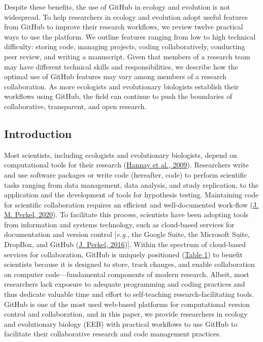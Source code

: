 Despite these benefits, the use of GitHub in ecology and evolution is not widespread.
To help researchers in ecology and evolution adopt useful features from GitHub to improve their research workflows, we review twelve practical ways to use the platform.
We outline features ranging from low to high technical difficulty: storing code, managing projects, coding collaboratively, conducting peer review, and writing a manuscript.
Given that members of a research team may have different technical skills and responsibilities, we describe how the optimal use of GitHub features may vary among members of a research collaboration.
As more ecologists and evolutionary biologists establish their workflows using GitHub, the field can continue to push the boundaries of collaborative, transparent, and open research.

\hypertarget{introduction}{%
\subsection{Introduction}\label{introduction}}

Most scientists, including ecologists and evolutionary biologists, depend on computational tools for their research (\protect\hyperlink{ref-fJWFe93e}{Hannay et al., 2009}).
Researchers write and use software packages or write code (hereafter, code) to perform scientific tasks ranging from data management, data analysis, and study replication, to the application and the development of tools for hypothesis testing.
Maintaining code for scientific collaboration requires an efficient and well-documented work-flow (\protect\hyperlink{ref-1Kqna6l2}{J. M. Perkel, 2020}).
To facilitate this process, scientists have been adopting tools from information and systems technology, such as cloud-based services for documentation and version control {[}\emph{e.g.}, the Google Suite, the Microsoft Suite, DropBox, and GitHub (\protect\hyperlink{ref-10ghgV3S8}{J. Perkel, 2016}){]}.
Within the spectrum of cloud-based services for collaboration, GitHub is uniquely positioned (\protect\hyperlink{tbl:compare}{Table 1}) to benefit scientists because it is designed to store, track changes, and enable collaboration on computer code---fundamental components of modern research.
Albeit, most researchers lack exposure to adequate programming and coding practices and thus dedicate valuable time and effort to self-teaching research-facilitating tools.
GitHub is one of the most used web-based platforms for computational version control and collaboration, and in this paper, we provide researchers in ecology and evolutionary biology (EEB) with practical workflows to use GitHub to facilitate their collaborative research and code management practices.

